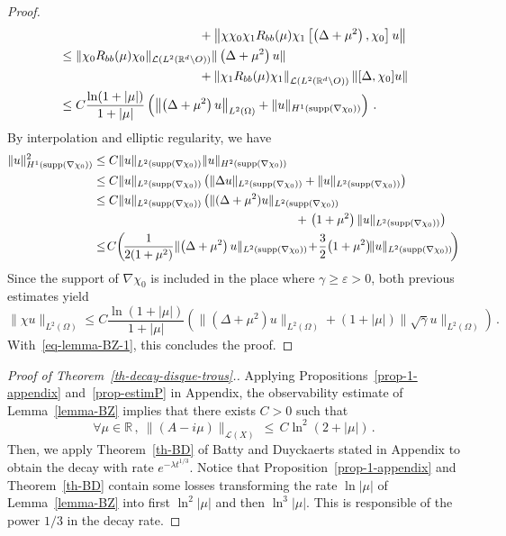 \documentclass[10pt]{amsart}
\theoremstyle{definition}\newtheorem{defi}[theo]{Definition}\newtheorem{rema}[theo]{Remark}\newtheorem{exam}[theo]{Example}\newtheorem{exem}[theo]{Example}\newtheorem{nota}[theo]{Notation}
\newcommand{\RR}{\mathbb{R}}
\newcommand{\Lc}{\mathcal{L}}
\newcommand{\grad}{\nabla}
\let\oldforall\forall
\renewcommand*{\forall}{\mathrel{\oldforall}}
\begin{document}
\begin{proof}
\begin{align*}
&\mkern200mu+ \left\|\chi\chi_0\chi_1 R_{bb}(\mu)\chi_1 \left[\left(\Delta+\mu^2\right),\chi_0\right] u\right\|\\
&\leq \|\chi_0 R_{bb}(\mu)\chi_0\|_{\Lc\left(L^2(\RR^d\setminus O)\right)}\|\left(\Delta+\mu^2\right) u\|\\
&\mkern200mu + \left\|\chi_1 R_{bb}(\mu)\chi_1\right\|_{\Lc\left(L^2(\RR^d\setminus O)\right)}
\|[\Delta,\chi_0] u\|\\
&\leq C \frac {\ln (1+|\mu|)}{1+|\mu|}\left(\left\|\left(\Delta+\mu^2\right) u\right\|_{L^2(\Omega)} + \|u\|_{H^1(\text{supp}(\grad \chi_0))}\right)\,.
\end{align*}
By interpolation and elliptic regularity, we have
\begin{align*}
\|u\|^2_{H^1(\text{supp}(\grad \chi_0))} & \leq C \|u\|_{L^2(\text{supp}(\grad
\chi_0))} \|u\|_{H^2(\text{supp}(\grad \chi_0))}\\
&\leq C \|u\|_{L^2(\text{supp}(\grad \chi_0))}\left(\|\Delta u\|_{L^2(\text{supp}(\grad \chi_0))} + \|u\|_{L^2(\text{supp}(\grad
\chi_0))}\right)\\
&\leq C \|u\|_{L^2(\text{supp}(\grad
\chi_0))}\left(\|(\Delta+\mu^2)u\|_{L^2(\text{supp}(\grad \chi_0))}\right.\\
& \mkern305mu + \left.\left(1+\mu^2\right)\|u\|_{L^2(\text{supp}(\grad \chi_0))}\right)\\
& \leq\!C\!\left(\!\frac 1{2(1+\mu^2)}\|\!\left(\Delta+\mu^2\right)u\|_{L^2(\text{supp}(\grad
\chi_0))}\! +\!
\frac 32\!\left(1+\mu^2\right)\!\!\|u\|_{L^2(\text{supp}(\grad \chi_0))}\!\right)
\end{align*}
Since the support of $\grad\chi_0$ is included in the place where $\gamma\geq
\varepsilon >0$, both previous estimates yield
\[
\|\chi u\|_{L^2(\Omega)} \leq C \frac {\ln (1+|\mu|)}{1+|\mu|}\left(
\|\left(\Delta+\mu^2\right) u\|_{L^2(\Omega)}
+ (1+|\mu|)\|\sqrt \gamma u\|_{L^2(\Omega)}\right)\,.
\]
With~\eqref{eq-lemma-BZ-1}, this concludes the proof.
\end{proof}

\begin{proof}[{Proof of Theorem~\ref{th-decay-disque-trous}.}] Applying Propositions~\ref{prop-1-appendix} and~\ref{prop-estimP} in Appendix, the observability estimate of Lemma~\ref{lemma-BZ} implies that there exists $C>0$ such that
\[
\forall \mu\in\RR\,,\:\|(A-i\mu)\|_{\Lc(X)}\,\leq\,C \ln^2(2+|\mu|)\,.
\]
Then, we apply Theorem~\ref{th-BD} of Batty and Duyckaerts stated in Appendix to obtain the decay with rate $e^{-\lambda t^{1/3}}$. Notice that Proposition~\ref{prop-1-appendix} and Theorem~\ref{th-BD} contain some losses transforming the rate $\ln |\mu|$ of Lemma~\ref{lemma-BZ} into first $\ln^2 |\mu|$ and then $\ln^3 |\mu|$. This is responsible of the power $1/3$ in the decay rate.
\end{proof}
\end{document}
